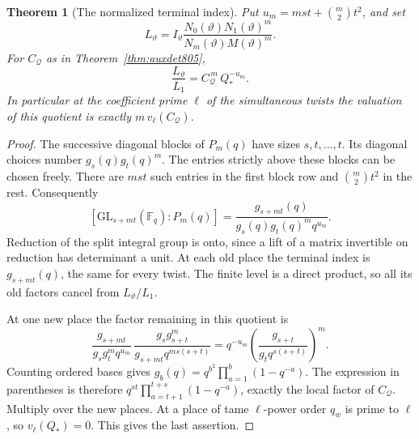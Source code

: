 \documentclass[a4paper,11pt]{article}
\newtheorem{theorem}[proposition]{Theorem}
\theoremstyle{definition}
\theoremstyle{remark}
\numberwithin{equation}{section}
\begin{document}
\begin{theorem}[The normalized terminal index]
\leavevmode\label{thm:terminalflag807}
Put \(u_m=mst+\binom{m}{2}t^2\), and set
\[
       L_\vartheta =
       I_\vartheta
          \frac{N_0(\vartheta)N_1(\vartheta)^m}
               {N_m(\vartheta)M(\vartheta)^m}.
\]
For \(C_{\mathcal Q}\) as in Theorem~\ref{thm:auxdet805},
\[
                \frac{L_\vartheta}{L_1}
                         =C_{\mathcal Q}^{\,m}\,Q_*^{-u_m}.
\]
In particular at the coefficient prime \(\ell\) of the
simultaneous twists the valuation of this quotient is exactly
\(m\,v_\ell(C_{\mathcal Q})\).
\end{theorem}
\begin{proof}
The successive diagonal blocks of \(P_m(q)\) have sizes
\(s,t,\ldots,t\). Its diagonal choices number \(g_s(q)g_t(q)^m\).
The entries strictly above these blocks can be chosen freely.
There are \(mst\) such entries in the first block row and
\(\binom{m}{2}t^2\) in the rest. Consequently
\[
       [\mathrm{GL}_{s+mt}(\mathbb F_q):P_m(q)]
          =\frac{g_{s+mt}(q)}{g_s(q)g_t(q)^m q^{u_m}} .
\]
Reduction of the split integral group is onto, since a lift of a
matrix invertible on reduction has determinant a unit. At each
old place the terminal index is \(g_{s+mt}(q)\), the same for
every twist. The finite level is a direct product, so all its
old factors cancel from \(L_\vartheta/L_1\).

At one new place the factor remaining in this quotient is
\[
     \frac{g_{s+mt}}{g_sg_t^m q^{u_m}}\,
     \frac{g_sg_{s+t}^m}{g_{s+mt}q^{ms(s+t)}}
       =q^{-u_m}\left(\frac{g_{s+t}}{g_t q^{s(s+t)}}\right)^m .
\]
Counting ordered bases gives
\(g_b(q)=q^{b^2}\prod_{a=1}^b(1-q^{-a})\).
The expression in parentheses is therefore
\(q^{st}\prod_{a=t+1}^{t+s}(1-q^{-a})\), exactly the local
factor of \(C_{\mathcal Q}\). Multiply over the new places.
At a place of tame \(\ell\)-power order \(q_w\) is prime to
\(\ell\), so \(v_\ell(Q_*)=0\). This gives the last assertion.
\end{proof}
\end{document}
